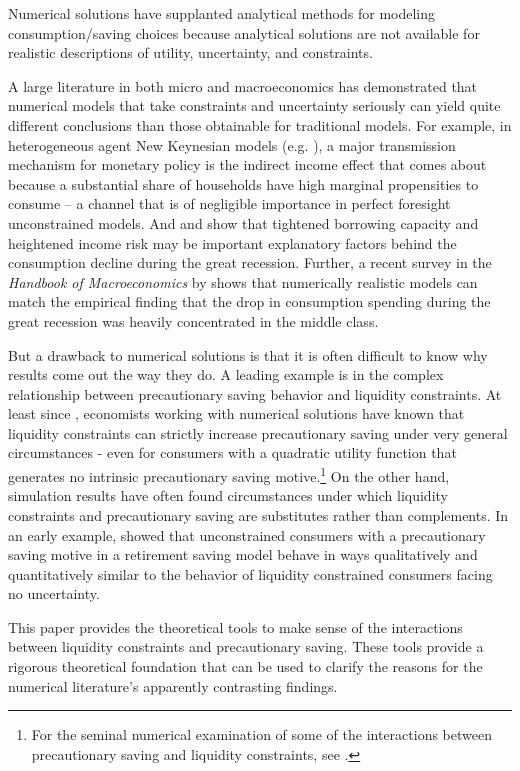 \documentclass[titlepage]{\econtex}
\begin{document}
  Numerical solutions have supplanted analytical methods for modeling consumption/saving choices because analytical solutions are not available for realistic descriptions of utility, uncertainty, and constraints.

  A large literature in both micro and macroeconomics has demonstrated that numerical models that take constraints and uncertainty seriously can yield quite different conclusions than those obtainable for traditional models. For example, in heterogeneous agent New Keynesian models (e.g. \citealp{kmvHANK}), a major transmission mechanism for monetary policy is the indirect income effect that comes about because a substantial share of households have high marginal propensities to consume -- a channel that is of negligible importance in perfect foresight unconstrained models. And \citet{glLiq} and \citet{blPrecautionary} show that tightened borrowing capacity and heightened income risk may be important explanatory factors behind the consumption decline during the great recession. Further, a recent survey in the \textit{Handbook of Macroeconomics} by \citet{kmpHandbook} shows that numerically realistic models can match the empirical finding that the drop in consumption spending during the great recession was heavily concentrated in the middle class.

  But a drawback to numerical solutions is that it is often difficult to know why results come out the way they do.  A leading example is in the complex relationship between precautionary saving behavior and liquidity constraints.  At least since \citet{zeldes:thesis}, economists working with numerical solutions have known that liquidity constraints can strictly increase precautionary saving under very general circumstances - even for consumers with a quadratic utility function that generates no intrinsic precautionary saving motive.\footnote{For the seminal numerical examination of some of the interactions between precautionary saving and liquidity constraints, see \citet{deatonLiqConstr}.} On the other hand, simulation results have often found circumstances under which liquidity constraints and precautionary saving are substitutes rather than complements.  In an early example, \citet{samwick:pensions} showed that unconstrained consumers with a precautionary saving motive in a retirement saving model behave in ways qualitatively and quantitatively similar to the behavior of liquidity constrained consumers facing no uncertainty.

  This paper provides the theoretical tools to make sense of the interactions between liquidity constraints and precautionary saving. These tools provide a rigorous theoretical foundation that can be used to clarify the reasons for the numerical literature's apparently contrasting findings.
\end{document}
